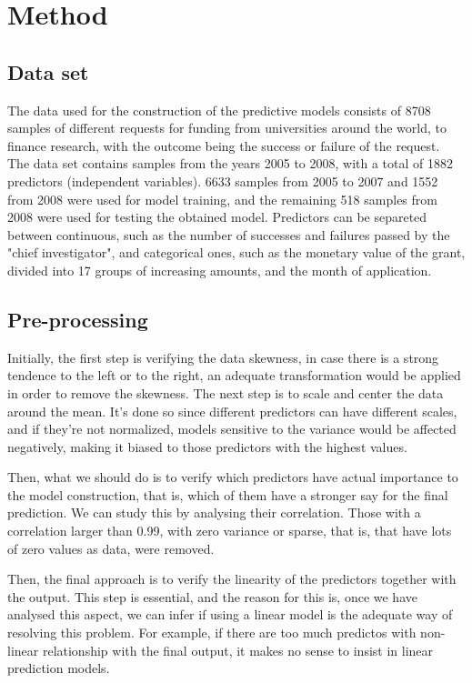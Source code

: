 \documentclass[conference]{IEEEtran}
\begin{document}
\section{Method}

\subsection{Data set}

The data used for the construction of the predictive models consists of 8708 samples
of different requests for funding from universities around the world, to finance research,
with the outcome being the success or failure of the request. The data set contains samples
from the years 2005 to 2008, with a total of 1882 predictors (independent variables). 
6633 samples from 2005 to 2007 and 1552 from 2008 were used for model training, and the 
remaining 518 samples from 2008 were used for testing the obtained model. Predictors can be 
separeted between continuous, such as the number of successes and failures passed by the 
"chief investigator", and categorical ones, such as the monetary value of the grant, 
divided into 17 groups of increasing amounts, and the month of application.

\subsection{Pre-processing}

Initially, the first step is verifying the data skewness, in case there is a strong 
tendence to the left or to the right, an adequate transformation would be applied in order to 
remove the skewness. The next step is to scale and center the data around the mean. It's 
done so since different predictors can have different scales, and if they're not normalized,
models sensitive to the variance would be affected negatively, making it biased to those
predictors with the highest values. 

Then, what we should do is to verify which predictors have actual importance to the model 
construction, that is, which of them have a stronger say for the final prediction. We can 
study this by analysing their correlation. Those with a correlation larger than 0.99, with
zero variance or sparse, that is, that have lots of zero values as data, were removed.

Then, the final approach is to verify the linearity of the predictors together with the output. 
This step is essential, and the reason for this is, once we have analysed this aspect, we can
infer if using a linear model is the adequate way of resolving this problem. For example, 
if there are too much predictos with non-linear relationship with the final output, it makes no 
sense to insist in linear prediction models.
\end{document}
